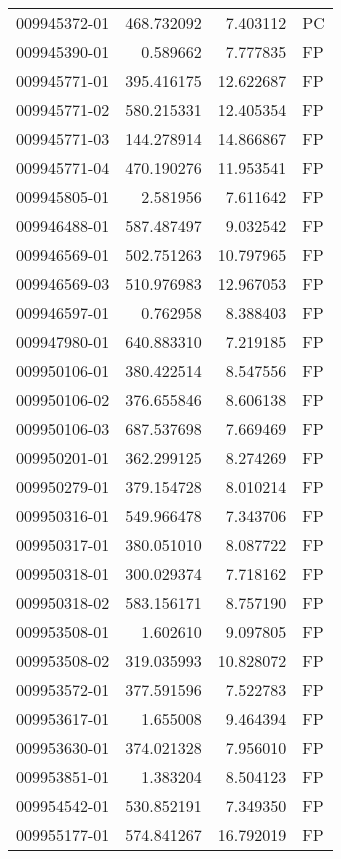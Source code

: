 \begin{tabular}{lrrl}
009945372-01 &  468.732092 &     7.403112 &   PC \\
009945390-01 &    0.589662 &     7.777835 &   FP \\
009945771-01 &  395.416175 &    12.622687 &   FP \\
009945771-02 &  580.215331 &    12.405354 &   FP \\
009945771-03 &  144.278914 &    14.866867 &   FP \\
009945771-04 &  470.190276 &    11.953541 &   FP \\
009945805-01 &    2.581956 &     7.611642 &   FP \\
009946488-01 &  587.487497 &     9.032542 &   FP \\
009946569-01 &  502.751263 &    10.797965 &   FP \\
009946569-03 &  510.976983 &    12.967053 &   FP \\
009946597-01 &    0.762958 &     8.388403 &   FP \\
009947980-01 &  640.883310 &     7.219185 &   FP \\
009950106-01 &  380.422514 &     8.547556 &   FP \\
009950106-02 &  376.655846 &     8.606138 &   FP \\
009950106-03 &  687.537698 &     7.669469 &   FP \\
009950201-01 &  362.299125 &     8.274269 &   FP \\
009950279-01 &  379.154728 &     8.010214 &   FP \\
009950316-01 &  549.966478 &     7.343706 &   FP \\
009950317-01 &  380.051010 &     8.087722 &   FP \\
009950318-01 &  300.029374 &     7.718162 &   FP \\
009950318-02 &  583.156171 &     8.757190 &   FP \\
009953508-01 &    1.602610 &     9.097805 &   FP \\
009953508-02 &  319.035993 &    10.828072 &   FP \\
009953572-01 &  377.591596 &     7.522783 &   FP \\
009953617-01 &    1.655008 &     9.464394 &   FP \\
009953630-01 &  374.021328 &     7.956010 &   FP \\
009953851-01 &    1.383204 &     8.504123 &   FP \\
009954542-01 &  530.852191 &     7.349350 &   FP \\
009955177-01 &  574.841267 &    16.792019 &   FP \\

\end{tabular}
